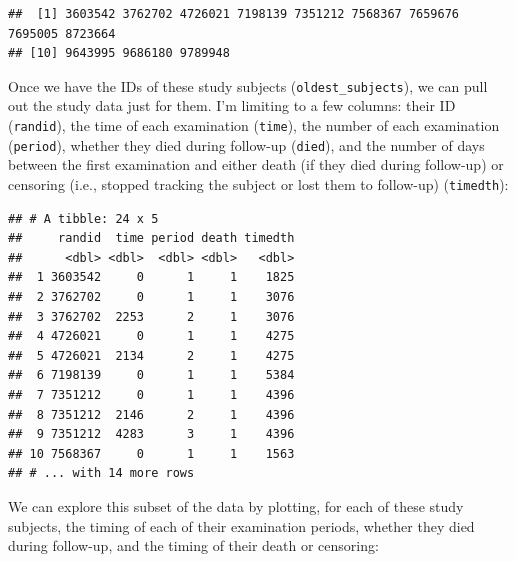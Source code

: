 \documentclass[
]{book}
\newenvironment{Shaded}{\begin{snugshade}}{\end{snugshade}}
\newcommand{\KeywordTok}[1]{\textcolor[rgb]{0.13,0.29,0.53}{\textbf{#1}}}
\newcommand{\NormalTok}[1]{#1}
\newcommand{\OperatorTok}[1]{\textcolor[rgb]{0.81,0.36,0.00}{\textbf{#1}}}
\newcommand{\StringTok}[1]{\textcolor[rgb]{0.31,0.60,0.02}{#1}}
\begin{document}
\begin{verbatim}
##  [1] 3603542 3762702 4726021 7198139 7351212 7568367 7659676 7695005 8723664
## [10] 9643995 9686180 9789948
\end{verbatim}

Once we have the IDs of these study subjects (\texttt{oldest\_subjects}), we can pull out the study data just for them. I'm limiting to a few columns: their ID (\texttt{randid}), the time of each examination (\texttt{time}), the number of each examination (\texttt{period}), whether they died during follow-up (\texttt{died}), and the number of days between the first examination and either death (if they died during follow-up) or censoring (i.e., stopped tracking the subject or lost them to follow-up) (\texttt{timedth}):

\begin{Shaded}
\end{Shaded}

\begin{verbatim}
## # A tibble: 24 x 5
##     randid  time period death timedth
##      <dbl> <dbl>  <dbl> <dbl>   <dbl>
##  1 3603542     0      1     1    1825
##  2 3762702     0      1     1    3076
##  3 3762702  2253      2     1    3076
##  4 4726021     0      1     1    4275
##  5 4726021  2134      2     1    4275
##  6 7198139     0      1     1    5384
##  7 7351212     0      1     1    4396
##  8 7351212  2146      2     1    4396
##  9 7351212  4283      3     1    4396
## 10 7568367     0      1     1    1563
## # ... with 14 more rows
\end{verbatim}

We can explore this subset of the data by plotting, for each of these study subjects, the timing of each of their examination periods, whether they died during follow-up, and the timing of their death or censoring:
\end{document}
